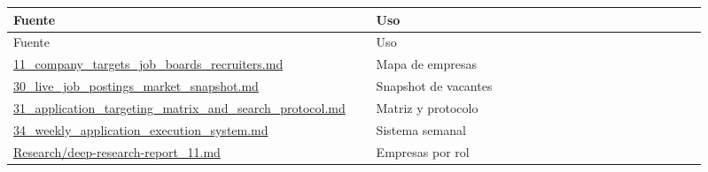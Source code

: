 \begin{center}
\scriptsize
\begin{longtable}{>{\raggedright\arraybackslash}p{0.455\linewidth} >{\raggedright\arraybackslash}p{0.455\linewidth}}
\toprule
Fuente & Uso \\
\midrule
\endfirsthead
\toprule
Fuente & Uso \\
\midrule
\endhead
\href{file:///E:/Laboral/11_company_targets_job_boards_recruiters.md}{11\_company\_targets\_job\_boards\_recruiters.md} & Mapa de empresas \\
\href{file:///E:/Laboral/30_live_job_postings_market_snapshot.md}{30\_live\_job\_postings\_market\_snapshot.md} & Snapshot de vacantes \\
\href{file:///E:/Laboral/31_application_targeting_matrix_and_search_protocol.md}{31\_application\_targeting\_matrix\_and\_search\_protocol.md} & Matriz y protocolo \\
\href{file:///E:/Laboral/34_weekly_application_execution_system.md}{34\_weekly\_application\_execution\_system.md} & Sistema semanal \\
\href{file:///E:/Laboral/Research/deep-research-report_11.md}{Research/deep-research-report\_11.md} & Empresas por rol \\
\bottomrule
\end{longtable}
\end{center}

